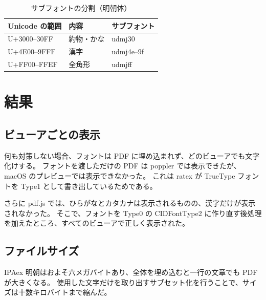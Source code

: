 \documentclass[11pt]{article}
\newcommand{\goth}[1]{{\sffamily #1}}
\begin{document}
\begin{table}[h]
\centering
\begin{tabular}{lll}
\hline
\textbf{Unicode の範囲} & 内容 & サブフォント \\
\hline
U+3000--30FF & 約物・かな & udmj30 \\
U+4E00--9FFF & 漢字 & udmj4e--9f \\
U+FF00--FFEF & 全角形 & udmjff \\
\hline
\end{tabular}
\caption{サブフォントの分割（明朝体）}
\end{table}

\section{\goth{結果}}
\subsection{\goth{ビューアごとの表示}}
何も対策しない場合、フォントは PDF に埋め込まれず、どのビューアでも文字化けする。
フォントを渡しただけの PDF は poppler では表示できたが、macOS のプレビューでは表示できなかった。
これは ratex が TrueType フォントを Type1 として書き出しているためである。

さらに pdf.js では、ひらがなとカタカナは表示されるものの、漢字だけが表示されなかった。
そこで、フォントを Type0 の CIDFontType2 に作り直す後処理を加えたところ、すべてのビューアで正しく表示された。

\subsection{\goth{ファイルサイズ}}
IPAex 明朝はおよそ六メガバイトあり、全体を埋め込むと一行の文章でも PDF が大きくなる。
使用した文字だけを取り出すサブセット化を行うことで、サイズは十数キロバイトまで縮んだ。
\end{document}
